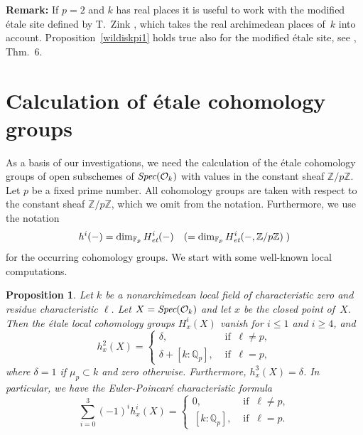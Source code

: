 \documentclass[10pt]{article}
\newcommand{\Spec}{\text{\it Spec}}
\newcommand{\Q}{{\mathbb Q}}
\newcommand{\Z}{{\mathbb Z}}
\newcommand{\F}{{\mathbb F}}
\renewcommand{\O}{{\mathcal{O}}}
\newcommand{\et}{\text{\it et}}
\theoremstyle{alex}
\newtheorem{proposition}[theorem]{Proposition}
\theoremstyle{alexdef}
\begin{document}
\noindent
{\bf Remark:} If $p=2$ and $k$ has real places it is useful to work with the modified \'{e}tale site defined by T.~Zink \cite{Zi}, which takes the real archimedean places of~$k$ into account. Proposition~\ref{wildiskpi1} holds true also for the modified \'{e}tale site,  see \cite{twoinf}, Thm.~6.


\section{Calculation of \'{e}tale cohomology groups}\label{calcsect}

As a basis of our investigations, we need the calculation of the \'{e}tale cohomology groups of open subschemes of $\Spec(\O_k)$ with values in the constant sheaf $\Z/p\Z$.
Let $p$ be a fixed prime number. All cohomology groups are taken with respect to the constant sheaf $\Z/p\Z$, which we omit from the notation. Furthermore, we use the notation
\[
h^i(-)=\dim_{\F_p} H^i_\et(-)\quad(=\dim_{\F_p} H^i_\et(-,\Z/p\Z)\;)
\]
for the occurring cohomology groups.  We start with some well-known local computations.

\begin{proposition}\label{localcoh}
Let $k$ be a nonarchimedean local field of characteristic zero and residue characteristic $\ell$. Let $X=\Spec(\O_k)$ and  let $x$ be the closed point of~$X$.   Then the \'{e}tale local cohomology groups $H^i_x(X)$ vanish for $i\leq 1$ and $i\geq 4$, and
\[
h^2_x(X)= \left\{
\begin{array}{cl}
\delta,& \text{ if }\ \ell\neq p,\\
\delta+[k:\Q_p],& \text{ if }\ \ell=p,
\end{array}\right.
\]
where $\delta=1$ if\/ $\mu_p\subset k$ and zero otherwise.
Furthermore, $h^3_x(X)=\delta$. In particular, we have the Euler-Poincar\'{e} characteristic formula
\[
\sum_{i=0}^3 (-1)^i h^i_x(X)= \left\{
\begin{array}{cl}
0,& \text{ if }\ \ell\neq p,\\
\,[k:\Q_p],& \text{ if }\ \ell=p.
\end{array}\right.
\]
\end{proposition}
\end{document}
